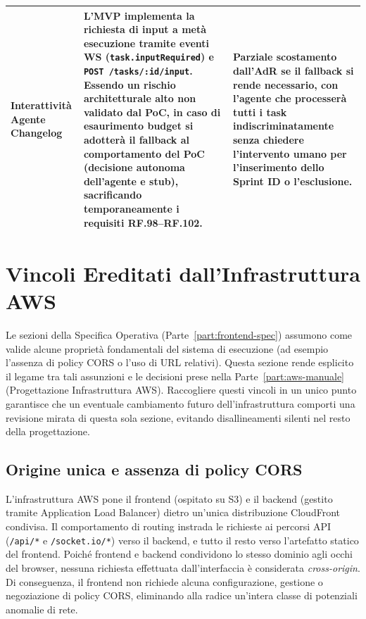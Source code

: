 \documentclass[11pt,a4paper]{article}
\begin{document}
\begin{table}[H]
\begin{tabularx}{\textwidth}{|X|X|X|}
Interattività Agente Changelog & L'MVP implementa la richiesta di input a metà esecuzione tramite eventi WS (\texttt{task.inputRequired}) e \texttt{POST /tasks/:id/input}. Essendo un rischio architetturale alto non validato dal PoC, in caso di esaurimento budget si adotterà il fallback al comportamento del PoC (decisione autonoma dell'agente e stub), sacrificando temporaneamente i requisiti RF.98--RF.102. & Parziale scostamento dall'AdR se il fallback si rende necessario, con l'agente che processerà tutti i task indiscriminatamente senza chiedere l'intervento umano per l'inserimento dello Sprint ID o l'esclusione. \\ \hline
\end{tabularx}
\end{table}

\section{Vincoli Ereditati dall'Infrastruttura AWS}
\label{sec:fe-vincoli-aws}

Le sezioni della Specifica Operativa (Parte~\ref{part:frontend-spec}) assumono come valide alcune proprietà fondamentali del sistema di esecuzione (ad esempio l'assenza di policy CORS o l'uso di URL relativi). Questa sezione rende esplicito il legame tra tali assunzioni e le decisioni prese nella Parte~\ref{part:aws-manuale} (Progettazione Infrastruttura AWS). Raccogliere questi vincoli in un unico punto garantisce che un eventuale cambiamento futuro dell'infrastruttura comporti una revisione mirata di questa sola sezione, evitando disallineamenti silenti nel resto della progettazione.

\subsection{Origine unica e assenza di policy CORS}

L'infrastruttura AWS pone il frontend (ospitato su S3) e il backend (gestito tramite Application Load Balancer) dietro un'unica distribuzione CloudFront condivisa. Il comportamento di routing instrada le richieste ai percorsi API (\texttt{/api/*} e \texttt{/socket.io/*}) verso il backend, e tutto il resto verso l'artefatto statico del frontend. Poiché frontend e backend condividono lo stesso dominio agli occhi del browser, nessuna richiesta effettuata dall'interfaccia è considerata \emph{cross-origin}. Di conseguenza, il frontend non richiede alcuna configurazione, gestione o negoziazione di policy CORS, eliminando alla radice un'intera classe di potenziali anomalie di rete.
\end{document}
